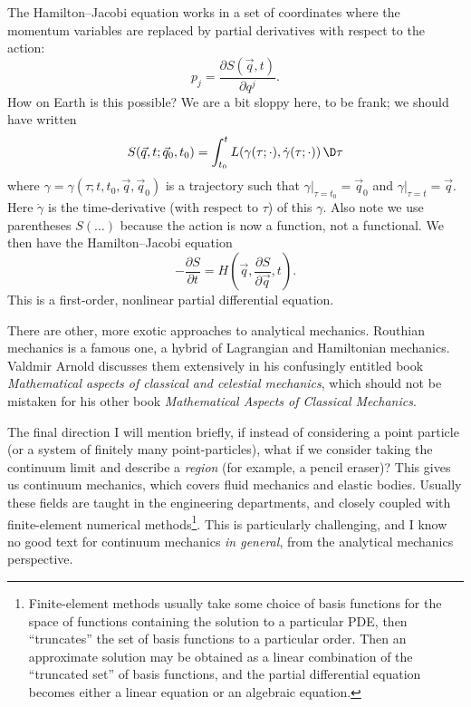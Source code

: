 The Hamilton--Jacobi equation works in a set of coordinates where the
momentum variables are replaced by partial derivatives with respect to
the action:
\begin{equation}
p_{j} = \frac{\partial S(\vec{q},t)}{\partial q^{j}}.
\end{equation}
How on Earth is this possible? We are a bit sloppy here, to be frank; we
should have written
\begin{equation}
S(\vec{q},t;\vec{q}_{0},t_{0}) = \int^{t}_{t_{0}} L(\gamma(\tau;\cdot),
\dot{\gamma}(\tau;\cdot))\,\D\tau
\end{equation}
where $\gamma=\gamma(\tau;t,t_{0},\vec{q},\vec{q}_{0})$ is a trajectory
such that $\gamma|_{\tau=t_{0}}=\vec{q}_{0}$ and $\gamma|_{\tau=t}=\vec{q}$.
Here $\dot\gamma$ is the time-derivative (with respect to $\tau$) of
this $\gamma$. Also note we use parentheses $S(\dots)$ because the
action is now a function, not a functional. We then have the
Hamilton--Jacobi equation 
\begin{equation}
-\frac{\partial S}{\partial t} = H\left(\vec{q},\frac{\partial S}{\partial\vec{q}},t\right).
\end{equation}
This is a first-order, nonlinear partial differential equation.

There are other, more exotic approaches to analytical
mechanics. Routhian mechanics is a famous one, a hybrid of Lagrangian
and Hamiltonian mechanics. Valdmir Arnold discusses them extensively in
his confusingly entitled book \emph{Mathematical aspects of classical and celestial mechanics},
which should not be mistaken for his other book \emph{Mathematical Aspects of Classical Mechanics}.

The final direction I will mention briefly, if instead of considering a
point particle (or a system of finitely many point-particles), what if
we consider taking the continuum limit and describe a \emph{region} (for
example, a pencil eraser)? This gives us continuum mechanics, which
covers fluid mechanics and elastic bodies. Usually these fields are
taught in the engineering departments, and closely coupled with
finite-element numerical methods\footnote{Finite-element methods usually
take some choice of basis functions for the space of functions
containing the solution to a particular PDE, then ``truncates'' the set
of basis functions to a particular order. Then an approximate solution
may be obtained as a linear combination of the ``truncated set'' of
basis functions, and the partial differential equation becomes either a
linear equation or an algebraic equation.}.
This is particularly challenging, and I know no good text for continuum
mechanics \emph{in general}, from the analytical mechanics perspective.

